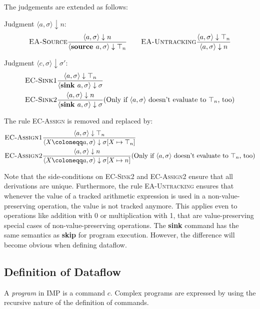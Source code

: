 The judgements are extended as follows:

Judgment $\langle a, \sigma \rangle \downarrow n$:
\begin{align*}
    \textsc{EA-Source}\frac{\displaystyle \langle a, \sigma \rangle \downarrow n}{\displaystyle \langle \textbf{source }a, \sigma \rangle \downarrow \top_n}
    \qquad     
    \textsc{EA-Untracking}\frac{\displaystyle \langle a, \sigma \rangle \downarrow \top_n}{\displaystyle \langle a, \sigma \rangle \downarrow n}
\end{align*}




Judgment $\langle c, \sigma \rangle \downarrow \sigma'$:
\begin{align*}
    &\textsc{EC-Sink1}\frac{\displaystyle \langle a, \sigma \rangle\downarrow \top_n}{\displaystyle \langle \textbf{sink } a, \sigma \rangle \downarrow \sigma}\\
    &\textsc{EC-Sink2}\frac{\displaystyle \langle a, \sigma\rangle \downarrow n}{\displaystyle \langle \textbf{sink } a, \sigma \rangle \downarrow \sigma}
    (\text{Only if $\langle a, \sigma\rangle$ doesn't evaluate to $\top_n$, too})
\end{align*}

The rule \textsc{EC-Assign} is removed and replaced by:
\begin{align*}
    &\textsc{EC-Assign1}\ddfrac{\langle a, \sigma\rangle \downarrow \top_n}
    {\langle X \coloneqq a, \sigma \rangle \downarrow \sigma[X \mapsto \top_n]}\\
    &\textsc{EC-Assign2}\ddfrac{\langle a, \sigma \rangle \downarrow n}
    {\langle X \coloneqq a, \sigma \rangle \downarrow \sigma[X \mapsto n]}
     (\text{Only if $\langle a, \sigma\rangle$ doesn't evaluate to $\top_n$, too})
\end{align*}

Note that the side-conditions on \textsc{EC-Sink2} and \textsc{EC-Assign2}
ensure that all derivations are unique.
Furthermore, the rule \textsc{EA-Untracking} ensures that whenever the value of
a tracked arithmetic expression is used in a non-value-preserving operation,
the value is not tracked anymore.
This applies even to operations like addition with 0 or multiplication with 1,
that are value-preserving special cases of non-value-preserving operations.
The \textbf{sink} command has the same semantics as \textbf{skip} 
for program execution.
However, the difference will become obvious when defining dataflow.

\subsection{Definition of Dataflow}
\begin{definition}[Program]
    A \emph{program} in IMP is a command $c$.
    Complex programs are expressed by using the recursive nature of
    the definition of commands.
\end{definition}


